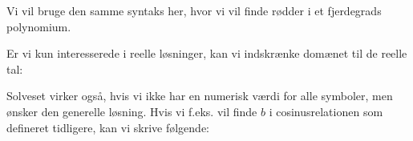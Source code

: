 \documentclass[letterpaper,10pt,english]{jupyterBook}
\begin{document}
\noindent{}

Vi vil bruge den samme syntaks her, hvor vi vil finde rødder i et fjerdegrads polynomium.

\begin{sphinxVerbatim}[commandchars=\\\{\}]
   
      
    
\end{sphinxVerbatim}

\noindent{}

Er vi kun interesserede i reelle løsninger, kan vi indskrænke domænet til de reelle tal:

\begin{sphinxVerbatim}[commandchars=\\\{\}]
    
\end{sphinxVerbatim}

\noindent{}

Solveset virker også, hvis vi ikke har en numerisk værdi for alle symboler, men ønsker den generelle løsning. Hvis vi f.eks. vil finde \(b\) i cosinusrelationen som defineret tidligere, kan vi skrive følgende:

\begin{sphinxVerbatim}[commandchars=\\\{\}]
   
\end{sphinxVerbatim}

\noindent{}
\end{document}
